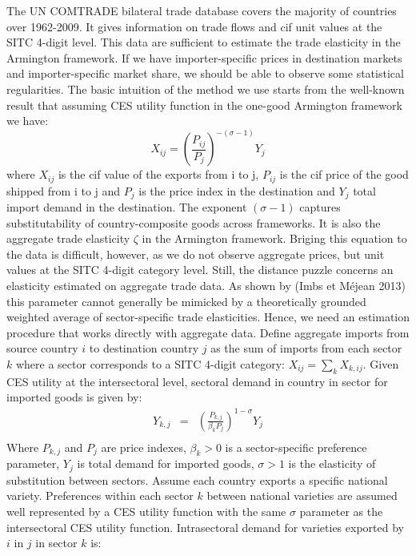 \documentclass[12pt,twoside,a4paper,notitlepage]{article}
\begin{document}
The UN COMTRADE bilateral trade database covers the majority of countries over 1962-2009. It gives information on trade flows and cif unit values at the SITC 4-digit level. This data are sufficient to estimate the trade elasticity in the Armington framework. If we have importer-specific prices in destination markets and importer-specific market share, we should be able to observe some statistical regularities. The basic intuition of the method we use starts from the well-known result that assuming CES utility function in the one-good Armington framework we have:
\[{{X}_{ij}}={{\left( \frac{{{P}_{ij}}}{{{P}_{j}}} \right)}^{-(\sigma -1)}}{{Y}_{j}}\]
where ${X}_{ij}$ is the cif value of the exports from i to j, ${{P}_{ij}}$ is the cif price of the good shipped from i to j and ${{P}_{j}}$ is the price index in the destination and ${{Y}_{j}}$ total import demand in the destination. The exponent $\left( \sigma -1 \right)$ captures substitutability of country-composite goods across frameworks. It is also the aggregate trade elasticity $\zeta $ in the Armington framework.
Briging this equation to the data is difficult, however, as we do not observe aggregate prices, but unit values at the SITC 4-digit category level. Still, the distance puzzle concerns an elasticity estimated on aggregate trade data. As shown by (Imbs et Méjean 2013) this parameter cannot generally be mimicked by a theoretically grounded weighted average of sector-specific trade elasticities. Hence, we need an estimation procedure that works directly with aggregate data.
Define aggregate imports from source country $i$ to destination country $j$  as the sum of imports from each sector $k$ where a sector corresponds to a SITC 4-digit category: ${{X}_{ij}}=\sum\limits_{k}{{{X}_{k,ij}}}$. Given CES utility at the intersectoral level, sectoral demand in country  in sector  for imported goods is given by: 
\[\begin{array}{*{35}{l}}
   {{Y}_{k,j}} & = & {{\left( \frac{{{P}_{k,j}}}{{{\beta }_{k}}{{P}_{j}}} \right)}^{1-\sigma }}{{Y}_{j}}  \\
\end{array}\]
Where ${{P}_{k,j}}$ and ${{P}_{j}}$ are price indexes, ${{\beta }_{k}}>0$ is a sector-specific preference parameter, ${{Y}_{j}}$ is total demand for imported goods, $\sigma >1$ is the elasticity of substitution between sectors. 
 Assume each country exports a specific national variety. Preferences within each sector $k$ between national varieties are assumed well represented by a CES utility function with the same $\sigma $ parameter as the intersectoral CES utility function. Intrasectoral demand for varieties exported by $i$ in $j$ in sector $k$ is: 
\end{document}
